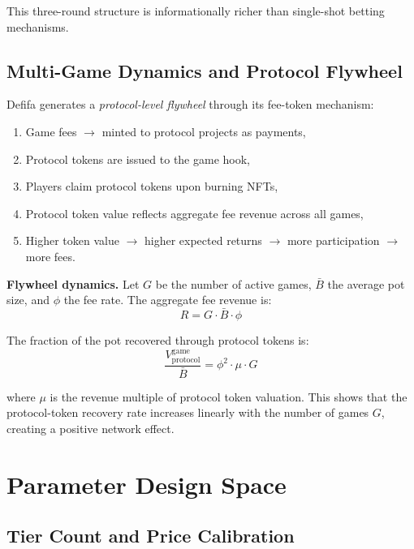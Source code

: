 \documentclass[11pt,a4paper]{article}
\begin{document}
This three-round structure is informationally richer than single-shot betting mechanisms.

\subsection{Multi-Game Dynamics and Protocol Flywheel}

Defifa generates a \emph{protocol-level flywheel} through its fee-token mechanism:

\begin{enumerate}[nosep]
    \item Game fees $\to$ minted to protocol projects as payments,
    \item Protocol tokens are issued to the game hook,
    \item Players claim protocol tokens upon burning NFTs,
    \item Protocol token value reflects aggregate fee revenue across all games,
    \item Higher token value $\to$ higher expected returns $\to$ more participation $\to$ more fees.
\end{enumerate}

\textbf{Flywheel dynamics.} Let $G$ be the number of active games, $\bar{B}$ the average pot size, and $\phi$ the fee rate. The aggregate fee revenue is:
\begin{equation}
R = G \cdot \bar{B} \cdot \phi
\end{equation}

The fraction of the pot recovered through protocol tokens is:
\begin{equation}
\frac{V_{\text{protocol}}^{\text{game}}}{\bar{B}} = \phi^2 \cdot \mu \cdot G
\end{equation}

where $\mu$ is the revenue multiple of protocol token valuation. This shows that the protocol-token recovery rate increases linearly with the number of games $G$, creating a positive network effect.

\section{Parameter Design Space}

\subsection{Tier Count and Price Calibration}
\end{document}
